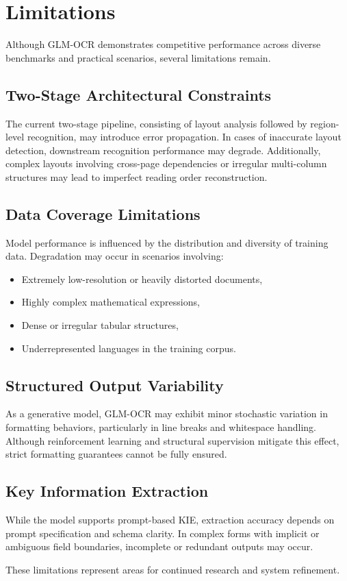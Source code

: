\section{Limitations}

Although GLM-OCR demonstrates competitive performance across diverse benchmarks and practical scenarios, several limitations remain.

\subsection{Two-Stage Architectural Constraints}

The current two-stage pipeline, consisting of layout analysis followed by region-level recognition, may introduce error propagation. In cases of inaccurate layout detection, downstream recognition performance may degrade. Additionally, complex layouts involving cross-page dependencies or irregular multi-column structures may lead to imperfect reading order reconstruction.

\subsection{Data Coverage Limitations}

Model performance is influenced by the distribution and diversity of training data. Degradation may occur in scenarios involving:

\begin{itemize}
    \item Extremely low-resolution or heavily distorted documents,
    \item Highly complex mathematical expressions,
    \item Dense or irregular tabular structures,
    \item Underrepresented languages in the training corpus.
\end{itemize}

\subsection{Structured Output Variability}

As a generative model, GLM-OCR may exhibit minor stochastic variation in formatting behaviors, particularly in line breaks and whitespace handling. Although reinforcement learning and structural supervision mitigate this effect, strict formatting guarantees cannot be fully ensured.

\subsection{Key Information Extraction}

While the model supports prompt-based KIE, extraction accuracy depends on prompt specification and schema clarity. In complex forms with implicit or ambiguous field boundaries, incomplete or redundant outputs may occur.

These limitations represent areas for continued research and system refinement.